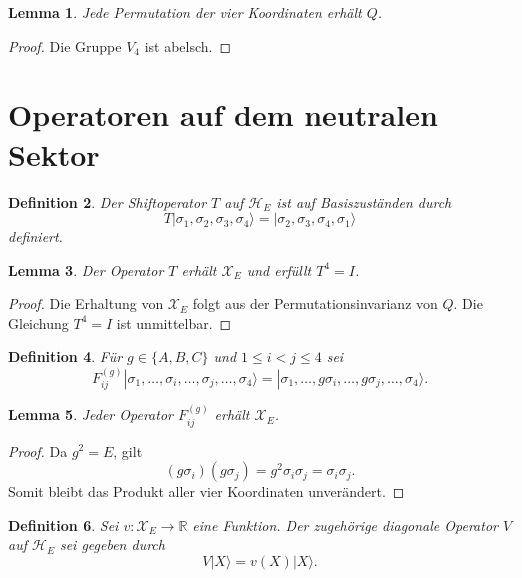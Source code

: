 \documentclass[11pt,a4paper]{article}
\newtheorem{definition}{Definition}[section]
\newtheorem{lemma}[definition]{Lemma}
\theoremstyle{remark}
\newcommand{\V}{V_4}
\newcommand{\XE}{\mathcal X_E}
\newcommand{\HE}{\mathcal H_E}
\begin{document}
	\begin{lemma}
		Jede Permutation der vier Koordinaten erhält \(Q\).
	\end{lemma}
	
	\begin{proof}
		Die Gruppe \(\V\) ist abelsch.
	\end{proof}
	
	\section{Operatoren auf dem neutralen Sektor}
	
	\begin{definition}
		Der Shiftoperator \(T\) auf \(\HE\) ist auf Basiszuständen durch
		\[
		T|\sigma_1,\sigma_2,\sigma_3,\sigma_4\rangle
		=
		|\sigma_2,\sigma_3,\sigma_4,\sigma_1\rangle
		\]
		definiert.
	\end{definition}
	
	\begin{lemma}
		Der Operator \(T\) erhält \(\XE\) und erfüllt \(T^4=I\).
	\end{lemma}
	
	\begin{proof}
		Die Erhaltung von \(\XE\) folgt aus der Permutationsinvarianz von \(Q\). Die Gleichung \(T^4=I\) ist unmittelbar.
	\end{proof}
	
	\begin{definition}
		Für \(g\in\{A,B,C\}\) und \(1\le i<j\le 4\) sei
		\[
		F_{ij}^{(g)}
		|\sigma_1,\dots,\sigma_i,\dots,\sigma_j,\dots,\sigma_4\rangle
		=
		|\sigma_1,\dots,g\sigma_i,\dots,g\sigma_j,\dots,\sigma_4\rangle.
		\]
	\end{definition}
	
	\begin{lemma}
		Jeder Operator \(F_{ij}^{(g)}\) erhält \(\XE\).
	\end{lemma}
	
	\begin{proof}
		Da \(g^2=E\), gilt
		\[
		(g\sigma_i)(g\sigma_j)=g^2\sigma_i\sigma_j=\sigma_i\sigma_j.
		\]
		Somit bleibt das Produkt aller vier Koordinaten unverändert.
	\end{proof}
	
	\begin{definition}
		Sei \(v:\XE\to\mathbb R\) eine Funktion. Der zugehörige diagonale Operator \(V\) auf \(\HE\) sei gegeben durch
		\[
		V|X\rangle=v(X)|X\rangle.
		\]
	\end{definition}
	
\end{document}
